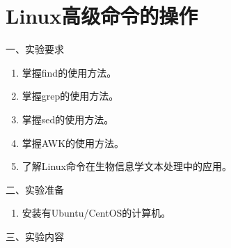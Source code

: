 \chapter{Linux高级命令的操作}

\noindent
一、实验要求
\begin{enumerate}
  \item 掌握find的使用方法。
  \item 掌握grep的使用方法。
  \item 掌握sed的使用方法。
  \item 掌握AWK的使用方法。
  \item 了解Linux命令在生物信息学文本处理中的应用。
\end{enumerate}

\vspace{0.2in}
\noindent
二、实验准备
\begin{enumerate}
  \item 安装有Ubuntu/CentOS的计算机。
\end{enumerate}

\vspace{0.2in}
\noindent
三、实验内容

